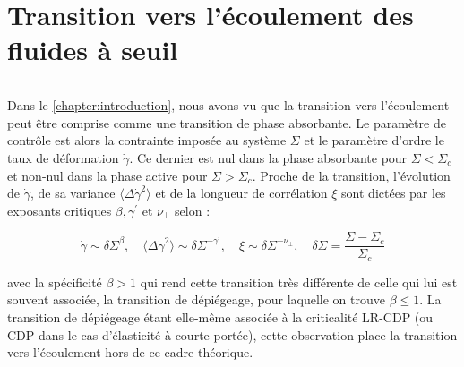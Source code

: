 \chapter{Transition vers l'écoulement des fluides à seuil}

\label{chapter:yielding}

\subparagraph{}Dans le \autoref{chapter:introduction}, nous avons vu que la transition vers l'écoulement peut être comprise comme une transition de phase absorbante. Le paramètre de contrôle est alors la contrainte imposée au système $\Sigma$ et le paramètre d'ordre le taux de déformation $\dot{\gamma}$. Ce dernier est nul dans la phase absorbante pour $\Sigma < \Sigma_c$ et non-nul dans la phase active pour $\Sigma > \Sigma_c$. Proche de la transition, l'évolution de $\dot{\gamma}$, de sa variance $\langle\Delta\dot{\gamma}^2\rangle$ et de la longueur de corrélation $\xi$ sont dictées par les exposants critiques $\beta, \gamma^\prime$ et $\nu_\perp$ selon :

\begin{equation}
	\dot{\gamma} \sim \delta\Sigma^\beta,\quad \langle\Delta\dot{\gamma}^2\rangle \sim \delta\Sigma^{-\gamma^\prime}, \quad \xi \sim \delta\Sigma^{-\nu_\perp}, \quad \delta\Sigma = \frac{\Sigma-\Sigma_c}{\Sigma_c}
\end{equation}

\noindent avec la spécificité $\beta>1$ qui rend cette transition très différente de celle qui lui est souvent associée, la transition de dépiégeage, pour laquelle on trouve $\beta \leq 1$. La transition de dépiégeage étant elle-même associée à la criticalité LR-CDP (ou CDP dans le cas d'élasticité à courte portée), cette observation place la transition vers l'écoulement hors de ce cadre théorique. 

